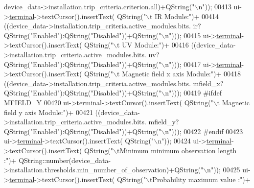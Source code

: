 \begin{DoxyCode}
      device\_data->installation.trip\_criteria.criterion.all)+QString(\textcolor{stringliteral}{"\(\backslash\)n"}));
00413        ui->\hyperlink{a00027_aae71c46ea4546df5994735dee573b2dd}{terminal}->textCursor().insertText( QString(\textcolor{stringliteral}{"\(\backslash\)t  IR Module:"})+
00414                                             ((device\_data->installation.trip\_criteria.active\_modules.bits.
      ir?QString(\textcolor{stringliteral}{"Enabled"}):QString(\textcolor{stringliteral}{"Disabled"}))+QString(\textcolor{stringliteral}{"\(\backslash\)n"})));
00415        ui->\hyperlink{a00027_aae71c46ea4546df5994735dee573b2dd}{terminal}->textCursor().insertText( QString(\textcolor{stringliteral}{"\(\backslash\)t  UV Module:"})+
00416                                             ((device\_data->installation.trip\_criteria.active\_modules.bits.
      uv?QString(\textcolor{stringliteral}{"Enabled"}):QString(\textcolor{stringliteral}{"Disabled"}))+QString(\textcolor{stringliteral}{"\(\backslash\)n"})));
00417        ui->\hyperlink{a00027_aae71c46ea4546df5994735dee573b2dd}{terminal}->textCursor().insertText( QString(\textcolor{stringliteral}{"\(\backslash\)t  Magnetic field x axis Module:"})+
00418                                             ((device\_data->installation.trip\_criteria.active\_modules.bits.
      mfield\_x?QString(\textcolor{stringliteral}{"Enabled"}):QString(\textcolor{stringliteral}{"Disabled"}))+QString(\textcolor{stringliteral}{"\(\backslash\)n"})));
00419 \textcolor{preprocessor}{#ifdef MFIELD\_Y}
00420        ui->\hyperlink{a00027_aae71c46ea4546df5994735dee573b2dd}{terminal}->textCursor().insertText( QString(\textcolor{stringliteral}{"\(\backslash\)t  Magnetic field y axis Module:"})+
00421                                             ((device\_data->installation.trip\_criteria.active\_modules.bits.
      mfield\_y?QString(\textcolor{stringliteral}{"Enabled"}):QString(\textcolor{stringliteral}{"Disabled"}))+QString(\textcolor{stringliteral}{"\(\backslash\)n"})));
00422 \textcolor{preprocessor}{#endif}
00423        ui->\hyperlink{a00027_aae71c46ea4546df5994735dee573b2dd}{terminal}->textCursor().insertText( QString(\textcolor{stringliteral}{"\(\backslash\)n"}));
00424        ui->\hyperlink{a00027_aae71c46ea4546df5994735dee573b2dd}{terminal}->textCursor().insertText( QString(\textcolor{stringliteral}{"\(\backslash\)tMinimum minimum observation length :"})+
      QString::number(device\_data->installation.thresholds.min\_number\_of\_observation)+QString(\textcolor{stringliteral}{"\(\backslash\)n"}));
00425        ui->\hyperlink{a00027_aae71c46ea4546df5994735dee573b2dd}{terminal}->textCursor().insertText( QString(\textcolor{stringliteral}{"\(\backslash\)tProbability maximum value :"})+

\end{DoxyCode}
